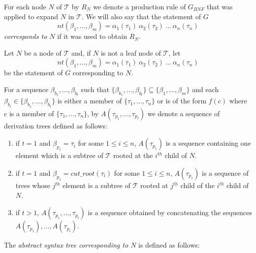 \documentclass[a4paper,10pt]{article}
\begin{document}
For each node $N$ of $\mathcal{T}$ by $R_{N}$ we denote a production rule of $G_{BNF}$  that was applied to expand $N$ in $\mathcal{T}$.
We will also say that the statement of $G$ 
$$nt(\beta_1,\ldots,\beta_m) = \alpha_1(\tau_1)~\alpha_2(\tau_2)~\ldots~\alpha_n(\tau_n)$$
\textit{corresponds to $N$}  if it was used to obtain $R_{N}$.


Let $N$ be a node of $\mathcal{T}$ and, if $N$ is not a leaf node of $\mathcal{T}$, let 
$$nt(\beta_1,\ldots,\beta_m) = \alpha_1(\tau_1)~\alpha_2(\tau_2)~\ldots~\alpha_n(\tau_n)$$
be the statement of $G$ corresponding to $N$.

For a sequence $\beta_{b_1}, \ldots, \beta_{b_t}$ such that $\{\beta_{b_1}, \ldots, \beta_{b_t}\} \subseteq \{\beta_1,\ldots, \beta_m\}$ and each $\beta_{b_i} \in \{\beta_{b_1}, \ldots, \beta_{b_t}\}$ is either a member of $\{\tau_1, \ldots, \tau_n\}$ or is of the form $f(c)$ where c is a member of $\{\tau_1, \ldots, \tau_n\}$, by 
$A(\tau_{p_1}, \ldots, \tau_{p_t})$ we denote a sequence of derivation trees defined as follows: 
\begin{enumerate}
\item if $t=1$ and  $\beta_{p_1} = \tau_i$ for some $1 \le i \le n$, $A(\tau_{p_1})$ is a sequence containing one element which is a subtree of $\mathcal{T}$ rooted at  the $i^{th}$ child of $N$.
\item if $t=1$ and  $\beta_{p_1} = cut\_root(\tau_i)$ for some $1 \le i \le n$, $A(\tau_{p_1})$ is a sequence of  trees whose $j^{th}$ element is a subtree of $\mathcal{T}$  rooted at  $j^{th}$ child of the $i^{th}$ child of $N$.
\item if $t>1$,  $A(\tau_{p_1}, \ldots, \tau_{p_t})$ is a sequence obtained by concatenating the sequences $A(\tau_{p_1}),\ldots,A(\tau_{p_t})$.
\end{enumerate} 

The \textit{abstract syntax tree corresponding to $N$} is defined as follows:
\end{document}
